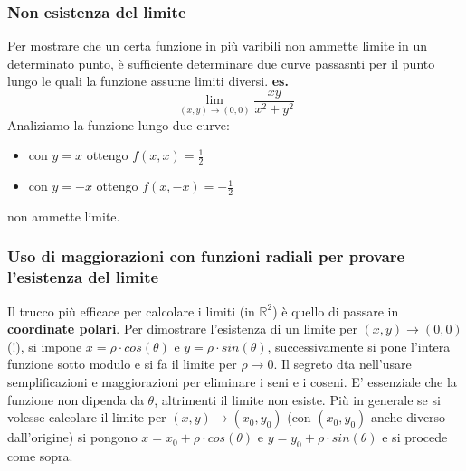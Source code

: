 \subsubsection{Non esistenza del limite}
Per mostrare che un certa funzione in più varibili non ammette limite in un determinato punto, è sufficiente determinare due curve passasnti per il punto lungo le quali la funzione assume limiti diversi.\newline
\newline
\textbf{es.} 
\[
    \lim_{(x,y)\rightarrow (0,0)} \frac{xy}{x^2+y^2}
\]
Analiziamo la funzione lungo due curve:
\begin{itemize}
    \item con $y=x$ ottengo $f(x,x) = \frac{1}{2}$
    \item con $y=-x$ ottengo $f(x,-x) = - \frac{1}{2}$
\end{itemize}
non ammette limite.
\subsubsection{Uso di maggiorazioni con funzioni radiali per provare l'esistenza del limite}
Il trucco più efficace per calcolare i limiti (in $\mathbb{R}^2$) è quello di passare in \textbf{coordinate polari}.\newline
\newline
Per dimostrare l'esistenza di un limite per $(x,y) \rightarrow (0,0)$ (!), si impone $x=\rho \cdot  cos(\theta)$ e $y= \rho \cdot sin(\theta)$, successivamente si pone l'intera funzione sotto modulo e si fa il limite per $\rho \rightarrow  0$. Il segreto dta nell'usare semplificazioni e maggiorazioni per eliminare i seni e i coseni. E' essenziale che la funzione non dipenda da $\theta$, altrimenti il limite non esiste.\newline
\newline
Più in generale se si volesse calcolare il limite per $(x,y) \rightarrow (x_0, y_0)$ (con $(x_0, y_0)$ anche diverso dall'origine) si pongono $x=x_0 +\rho \cdot  cos(\theta)$ e $y= y_0 + \rho \cdot sin(\theta)$ e si procede come sopra.\newline
\newline
